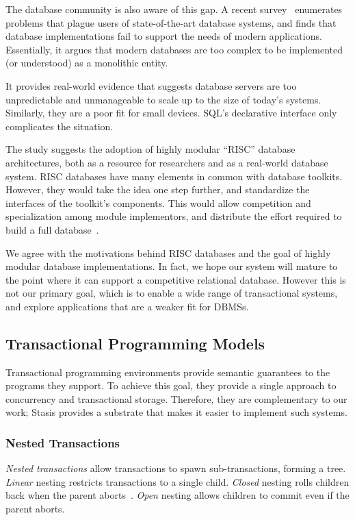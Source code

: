 \documentclass[letterpaper,twocolumn,10pt]{article}
\newcommand{\yad}{Stasis\xspace}
\begin{document}
The database community is also aware of this gap.  A recent
survey~\cite{riscDB} enumerates problems that plague users of
state-of-the-art database systems, and finds that database
implementations fail to support the needs of modern applications.
Essentially, it argues that modern databases are too complex to be
implemented (or understood) as a monolithic entity.

It provides real-world evidence that suggests database servers are too
unpredictable and unmanageable to scale up to the size of today's
systems.  Similarly, they are a poor fit for small devices.  SQL's
declarative interface only complicates the situation.

The study suggests the adoption of highly modular ``RISC'' database
architectures, both as a resource for researchers and as a real-world
database system.  RISC databases have many elements in common with
database toolkits.  However, they would take the idea one step
further, and standardize the interfaces of the toolkit's components.
This would allow competition and specialization among module
implementors, and distribute the effort required to build a full
database~\cite{riscDB}.

We agree with the motivations behind RISC databases and the goal
of highly modular database implementations.  In fact, we  hope
 our system will mature to the point where it can support a
competitive relational database.  However this is not our primary
goal, which is to enable a wide range of transactional systems, and
explore applications that are a weaker fit for DBMSs.

\subsection{Transactional Programming Models}

\label{sec:transactionalProgramming}

Transactional programming environments provide semantic guarantees to
the programs they support.  To achieve this goal, they provide a
single approach to concurrency and transactional storage.
Therefore, they are complementary to our work; \yad provides a
substrate that makes it easier to implement such systems.

\subsubsection{Nested Transactions}

{\em Nested transactions} allow transactions to spawn sub-transactions,
forming a tree.  {\em Linear} nesting
restricts transactions to a single child.  {\em Closed} nesting rolls
children back when the parent aborts~\cite{nestedTransactionBook}.
{\em Open} nesting allows children to commit even if the parent
aborts.
\end{document}
